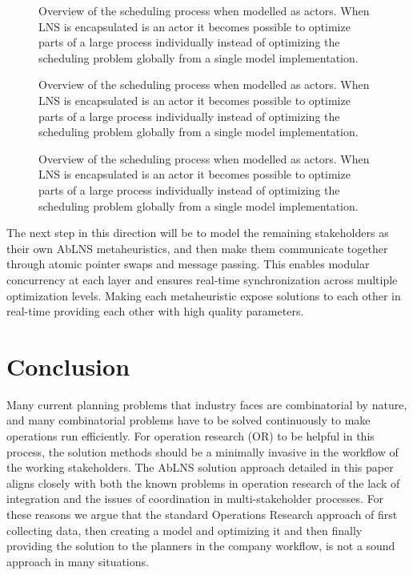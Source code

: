 \begin{figure}[H]
	\centering
	
	\resizebox{0.7\textwidth}{!}{
		\drawModelSetupHexagon[metaheuristics=true]
	}
	\caption{
		Overview of the scheduling process when modelled as actors. When LNS is encapsulated 
		is an actor it becomes possible to optimize parts of a large process individually instead of 
		optimizing the scheduling problem globally from a single model implementation.
	}
	\label{fig:ordinator-hexagon:metaheuristics}
\end{figure}

\begin{figure}[H]
	\centering
	
	\resizebox{0.7\textwidth}{!}{
		\drawModelSetupHexagon[orchestrator=true]
	}
	\caption{
		Overview of the scheduling process when modelled as actors. When LNS is encapsulated 
		is an actor it becomes possible to optimize parts of a large process individually instead of 
		optimizing the scheduling problem globally from a single model implementation.
	}
	\label{fig:ordinator-hexagon:orchestrator}
\end{figure}
\begin{figure}[H]
	\centering
	
	\resizebox{0.7\textwidth}{!}{
		\drawModelSetupHexagon[userinterface=true]
	}
	\caption{
		Overview of the scheduling process when modelled as actors. When LNS is encapsulated 
		is an actor it becomes possible to optimize parts of a large process individually instead of 
		optimizing the scheduling problem globally from a single model implementation.
	}
	\label{fig:ordinator-hexagon:userinterfaces}
\end{figure}

The next step in this direction will be to model the remaining stakeholders as their own 
AbLNS metaheuristics, and then make them communicate together through atomic pointer swaps and message
passing. This enables modular concurrency at each layer and ensures real-time
synchronization across multiple optimization levels. Making each metaheuristic expose solutions to each 
other in real-time providing each other with high quality parameters.

\section{Conclusion}
Many current planning problems that industry faces are combinatorial by nature, 
and many combinatorial problems have to be solved continuously to make operations 
run efficiently. For operation research (OR) to be helpful in this process, the solution methods 
should be a minimally invasive in the workflow of the working stakeholders. 
The AbLNS solution approach detailed in this paper aligns
closely with both the known problems in operation research of the lack of integration and the issues of 
coordination in multi-stakeholder processes. For these reasons we argue that the
standard Operations Research approach of  first collecting data, then creating a
model and optimizing it and then finally providing the solution to the planners
in the company workflow, is not a sound approach in many situations.

